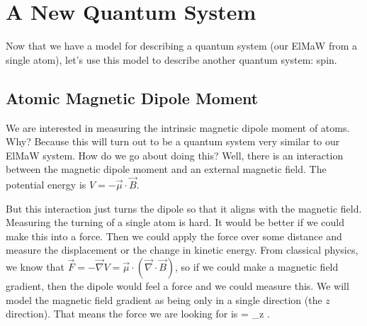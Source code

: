 \chapter{A New Quantum System}
Now that we have a model for describing a quantum system (our ElMaW from a single atom), let's use this model to describe another quantum system: spin.

\section{Atomic Magnetic Dipole Moment}

We are interested in measuring the intrinsic magnetic dipole moment of atoms. Why? Because this will turn out to be a quantum system very similar to our ElMaW system. How do we go about doing this? Well, there is an interaction between the magnetic dipole moment and an external magnetic field. The potential energy is $V={-\vec{\mu}\cdot\vec{B}}$.
\begin{marginfigure}\centering
{}
\end{marginfigure}
But this interaction just turns the dipole so that it aligns with the magnetic field. Measuring the turning of a single atom is hard. It would be better if we could make this into a force. Then we could apply the force over some distance and measure the displacement or the change in kinetic energy. From classical physics, we know that $\vec{F}=-\vec{\nabla} V = \vec{\mu}\cdot(\vec{\nabla}\cdot\vec{B})$, so if we could make a magnetic field gradient, then the dipole would feel a force and we could measure this. We will model the magnetic field gradient as being only in a single direction (the $z$ direction). That means the force we are looking for is
\beq
{} = \mu_z .
\eeq
